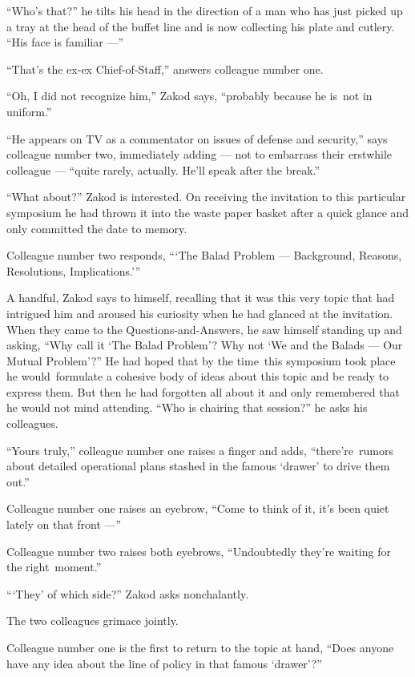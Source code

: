 \documentclass[twoside,11pt]{book}
\begin{document}
``Who's that?'' he tilts his head in the direction of a man who has just picked up a tray at
the head of the buffet line and is now collecting his plate and cutlery. ``His face is familiar ---''

``That's the ex-ex Chief-of-Staff,'' answers colleague number one.

``Oh, I did not recognize him,'' Zakod says, ``probably because he is~not in
uniform.''

``He appears on TV as a commentator on issues of defense and security,'' says colleague number
two, immediately adding --- not to embarrass their erstwhile colleague --- ``quite rarely, actually. He'll
speak after the break.''

``What about?'' Zakod is interested. On receiving the invitation to this particular symposium
he had thrown it into the waste paper basket after a quick glance and only committed the date to memory.

Colleague number two responds, ``{\thinspace}`The Balad Problem --- Background, Reasons, Resolutions,
Implications.'\thinspace''

A handful, Zakod says to himself, recalling that it was this very topic that had intrigued him and aroused his curiosity
when he had glanced at the invitation. When they{ }came{ }to
the Questions-and-Answers{, }he saw himself standing up and asking, ``Why call it `The
Balad Problem'? Why not `We and the Balads --- Our Mutual Problem'?'' He had hoped that by the time~this
symposium{ }took place he would~formulate a cohesive body of ideas about this topic and be ready to
express them. But then he had forgotten all about it and only remembered that he would not mind attending.
``Who is chairing that session?'' he asks his colleagues.

``Yours truly,'' colleague number one raises a finger and adds, ``there're~rumors
about detailed operational plans stashed in the famous `drawer' to drive them out.''

Colleague number one raises an eyebrow, ``Come to think of it, it's been quiet lately on that front ---''

Colleague number two raises both eyebrows, ``Undoubtedly they're waiting for the
right~moment.''

``{\thinspace}`They' of which side?'' Zakod asks nonchalantly.

The two colleagues grimace jointly.

Colleague number one is the first to return to the topic at hand, ``Does anyone have any idea about the
line of policy in that famous `drawer{}'?''
\end{document}
